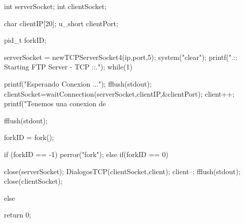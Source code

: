\begin{DoxyCode}
                                                      {
        
        int serverSocket;
        int clientSocket;       
        
        
        char clientIP[20];
        u_short clientPort;

        pid_t forkID;

        serverSocket = newTCPServerSocket4(ip,port,5);
        system("clear");
        printf(".:: Starting FTP  Server - TCP ::.\n\n");
        while(1){
                printf("Esperando Conexion ...\n");
                fflush(stdout);
                clientSocket=waitConnection(serverSocket,clientIP,&clientPort);
                client++;
                printf("Tenemos una conexion de %
      
                fflush(stdout);
                
                forkID = fork();
                
                if (forkID == -1){
                        perror("fork");
                } else if(forkID == 0) {
                        close(serverSocket);
                        DialogosTCP(clientSocket,client);
                        client--;
                        fflush(stdout);
                        close(clientSocket);
                                
                } else {
                        
                }
                                
        }
        return 0;
}
\end{DoxyCode}
